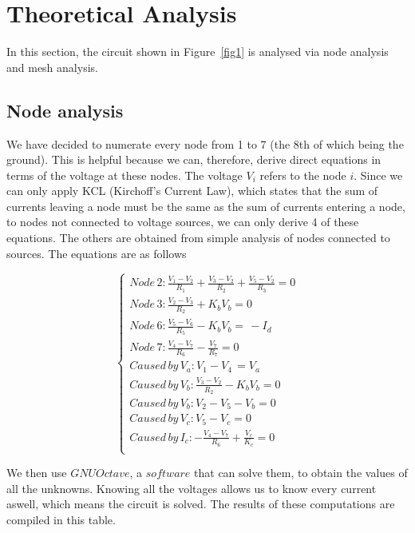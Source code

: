 \section{Theoretical Analysis}
\label{sec:analysis}

In this section, the circuit shown in Figure~\ref{fig1} is analysed via node analysis and mesh analysis.

\subsection{Node analysis}

We have decided to numerate every node from 1 to 7 (the 8th of which being the ground). This is helpful because we can, therefore, derive direct equations in terms of the voltage at these nodes.
The voltage $V_i$ refers to the node $i$. Since we can only apply KCL (Kirchoff's Current Law), which states that the sum of currents leaving a node must be the same as the sum of currents entering a node, to nodes not connected to voltage sources, we can only derive 4 of these equations. The others are obtained from simple analysis of nodes connected to sources. The equations are as follows

\begin{equation} 
\begin{cases}  
    Node\, 2: \frac{V_1 - V_2}{R_1} + \frac{V_3 - V_2}{R_2} + \frac{V_5 - V_2}{R_3} = 0 \\
    Node\, 3: \frac{V_2 - V_3}{R_2} + K_bV_b = 0 \\
    Node\, 6: \frac{V_5 - V_6}{R_5} - K_bV_b = \,  - I_d \\
    Node\, 7: \frac{V_4 - V_7}{R_6} - \frac{V_7}{R_7} = 0 \\
    Caused\, by\, V_a : V_1 - V_4 \, = V_a \\
    Caused\, by\, V_b : \frac{V_3 - V_2}{R_2} - K_bV_b  = 0\\
    Caused\, by\, V_b : V_2 - V_5 - V_b = 0 \\
    Caused\, by\, V_c : V_5 - V_c = 0 \\
    Caused\, by\, I_c : - \frac{V_4 - V_7}{R_6} + \frac{V_c}{K_c} = 0\\
    
\end{cases}
\label{eq:1}
\end{equation}

We then use $GNU Octave$, a $software$ that can solve them, to obtain the values of all the unknowns. Knowing all the voltages allows us to know every current aswell, which means the circuit is solved.
The results of these computations are compiled in this table.

